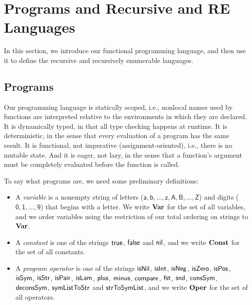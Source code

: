 \section{Programs and Recursive and RE Languages}
\label{ProgramsAndRecursiveAndRELanguages}

In this section, we introduce our functional programming language,
and then use it to define the recursive and recursively enumerable
languages.

\subsection{Programs}

%
Our programming language is statically scoped, i.e., nonlocal names
used by functions are interpreted relative to the environments in
which they are declared.  It is dynamically typed, in that all type
checking happens at runtime.  It is deterministic, in the sense that
every evaluation of a program has the same result.  It is functional,
not imperative (assignment-oriented), i.e., there is no mutable state.
And it is eager, not lazy, in the sense that a function's argument
must be completely evaluated before the function is called.

To say what programs are, we need some preliminary definitions:
\begin{itemize}
\item A \emph{variable} is a nonempty string of letters
%
%
  ($\mathsf{a,b,\ldots,z,A,B,\ldots,Z}$) and digits
  ($\mathsf{0,1,\ldots,9}$) that begins with a letter.  We write
  $\mathbf{Var}$ for the set of all variables, and we order variables
  using the restriction of our total ordering on strings to
  $\mathbf{Var}$.

\item A \emph{constant} is one of the strings $\mathsf{true}$, $\mathsf{false}$ and
%
%
  $\mathsf{nil}$, and we write $\mathbf{Const}$ for the set of all constants.

\item A \emph{program operator} is one of the strings
%
  $\mathsf{isNil}$, $\mathsf{isInt}$, $\mathsf{isNeg}$, $\mathsf{isZero}$,
  $\mathsf{isPos}$, $\mathsf{isSym}$, $\mathsf{isStr}$, $\mathsf{isPair}$,
  $\mathsf{isLam}$, $\mathsf{plus}$, $\mathsf{minus}$, $\mathsf{compare}$, $\mathsf{fst}$,
  $\mathsf{snd}$, $\mathsf{consSym}$, $\mathsf{deconsSym}$, $\mathsf{symListToStr}$ and
  $\mathsf{strToSymList}$, and we write $\mathbf{Oper}$ for the set of
%
  all operators.
\end{itemize}

